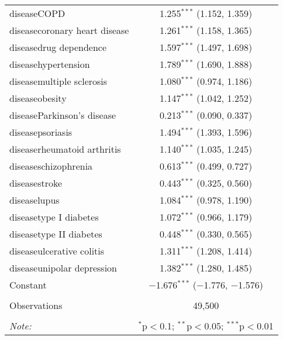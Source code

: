 \begin{table}[!htbp]
\begin{tabular}{@{\extracolsep{5pt}}lc}
  diseaseCOPD & 1.255$^{***}$ (1.152, 1.359) \\ 
  diseasecoronary heart disease & 1.261$^{***}$ (1.158, 1.365) \\ 
  diseasedrug dependence & 1.597$^{***}$ (1.497, 1.698) \\ 
  diseasehypertension & 1.789$^{***}$ (1.690, 1.888) \\ 
  diseasemultiple sclerosis & 1.080$^{***}$ (0.974, 1.186) \\ 
  diseaseobesity & 1.147$^{***}$ (1.042, 1.252) \\ 
  diseaseParkinson's disease & 0.213$^{***}$ (0.090, 0.337) \\ 
  diseasepsoriasis & 1.494$^{***}$ (1.393, 1.596) \\ 
  diseaserheumatoid arthritis & 1.140$^{***}$ (1.035, 1.245) \\ 
  diseaseschizophrenia & 0.613$^{***}$ (0.499, 0.727) \\ 
  diseasestroke & 0.443$^{***}$ (0.325, 0.560) \\ 
  diseaselupus & 1.084$^{***}$ (0.978, 1.190) \\ 
  diseasetype I diabetes & 1.072$^{***}$ (0.966, 1.179) \\ 
  diseasetype II diabetes & 0.448$^{***}$ (0.330, 0.565) \\ 
  diseaseulcerative colitis & 1.311$^{***}$ (1.208, 1.414) \\ 
  diseaseunipolar depression & 1.382$^{***}$ (1.280, 1.485) \\ 
  Constant & $-$1.676$^{***}$ ($-$1.776, $-$1.576) \\ 
 \hline \\[-1.8ex] 
Observations & 49,500 \\ 
\hline 
\hline \\[-1.8ex] 
\textit{Note:}  & \multicolumn{1}{r}{$^{*}$p$<$0.1; $^{**}$p$<$0.05; $^{***}$p$<$0.01} \\ 
\end{tabular} 
\end{table} 
